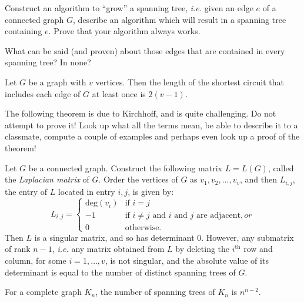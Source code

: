 \begin{exercise} Construct an algorithm to ``grow'' a spanning tree, \textit{i.e.} given an edge $e$ of a connected graph $G$, describe an algorithm which will result in a spanning tree containing $e$.  Prove that your algorithm always works.
\end{exercise}

\begin{exercise} What can be said (and proven) about those edges that are contained in every spanning tree?  In none?
\end{exercise}

\begin{theorem} Let $G$ be a graph with $v$ vertices.  Then the length of the shortest circuit that includes each edge of $G$ at least once is $2(v-1)$.
\end{theorem}

\begin{exercise} The following theorem is due to Kirchhoff, and is quite challenging.  Do not attempt to prove it!  Look up what all the terms mean, be able to describe it to a classmate, compute a couple of examples and perhaps even look up a proof of the theorem!
\end{exercise}

\begin{theorem} Let $G$ be a connected graph.  Construct the following matrix $L=L(G)$, called the \textit{Laplacian matrix} of $G$.  Order the vertices of $G$ as $v_1, v_2, \ldots, v_v$, and then $L_{i,j}$, the entry of $L$ located in entry $i,j$, is given by:
\begin{equation*}
L_{i,j} = \left\{
\begin{array}{ll}
\text{deg}(v_i)& \text{if }i=j\\
-1 & \text{if $i \neq j$ and $i$ and $j$ are adjacent}, or\\
0& \text{otherwise.}
\end{array}
\right.
\end{equation*}
Then $L$ is a singular matrix, and so has determinant 0.  However, any submatrix of rank $n-1$, \textit{i.e.} any matrix obtained from $L$ by deleting the $i^{\text{th}}$ row and column, for some $i=1, \ldots, v$, is not singular, and the absolute value of its determinant is equal to the number of distinct spanning trees of $G$.
\end{theorem}

\begin{corollary} For a complete graph $K_n$, the number of spanning trees of $K_n$ is $n^{n-2}$.
\end{corollary}

